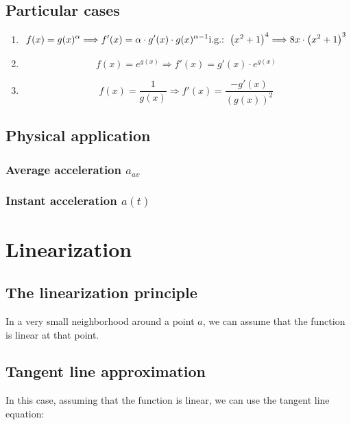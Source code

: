 \documentclass{article}
\begin{document}
\subsection{Particular cases}
\begin{enumerate}
    \item \[f(x) = g(x)^\alpha \Longrightarrow f'(x)=\alpha \cdot g'(x) \cdot g(x)^{\alpha -1}
    \\ \text{i.g.: } \left(x^2+1\right)^4 \Longrightarrow 8x \cdot \left(x^2+1\right)^3\]
    \item \[f(x) = e^{g(x)} \Longrightarrow f'(x)=g'(x)\cdot e^{g(x)}\]
    \item \[f(x) = \frac{1}{g(x)} \Longrightarrow f'(x)=\frac{-g'(x)}{\left(g(x)\right)^2}\]
\end{enumerate}

\subsection{Physical application}

\subsubsection{Average acceleration $a_{av}$}

\subsubsection{Instant acceleration $a(t)$}

\newpage
\section{Linearization}
\subsection{The linearization principle}
In a very small neighborhood around a point $a$, we can assume that
the function is linear at that point.

\subsection{Tangent line approximation}
In this case, assuming that the function is linear, we can use the
tangent line equation:
\end{document}
